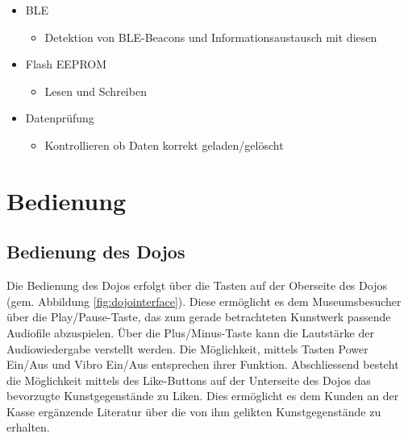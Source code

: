 \documentclass[10pt,a4paper,oneside]{99_fhnwreport}
\begin{document}
\begin{itemize}
	\item{BLE}
	\begin{itemize}
		\item{Detektion von BLE-Beacons und Informationsaustausch mit diesen}
	\end{itemize}
\end{itemize}

\begin{itemize}
	\item{Flash EEPROM}
	\begin{itemize}
		\item{Lesen und Schreiben}
	\end{itemize}
\end{itemize}

\begin{itemize}
	\item{Datenprüfung}
	\begin{itemize}
		\item{Kontrollieren ob Daten korrekt geladen/gelöscht}
	\end{itemize}
\end{itemize}

\section{Bedienung}\label{sec:bedienung}
\subsection{Bedienung des Dojos}
Die Bedienung des Dojos erfolgt über die Tasten auf der Oberseite des Dojos (gem. Abbildung \ref{fig:dojointerface}). Diese ermöglicht es dem Museumsbesucher über die Play/Pause-Taste, das zum gerade betrachteten Kunstwerk passende Audiofile abzuspielen. Über die Plus/Minus-Taste kann die Lautstärke der Audiowiedergabe verstellt werden. Die Möglichkeit, mittels Tasten Power Ein/Aus und Vibro Ein/Aus entsprechen ihrer Funktion. Abschliessend besteht die Möglichkeit mittels des Like-Buttons auf der Unterseite des Dojos das bevorzugte Kunstgegenstände zu Liken. Dies ermöglicht es dem Kunden an der Kasse ergänzende Literatur über die von ihm gelikten Kunstgegenstände zu erhalten.
\end{document}
